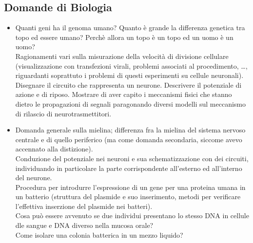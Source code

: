 \documentclass[a4paper,11pt]{article}
\begin{document}
\subsection*{Domande di Biologia}
\begin{itemize}
\item Quanti geni ha il genoma umano? Quanto \`e grande la differenza genetica tra topo ed essere umano? Perch\`e allora un topo \`e un topo ed un uomo \`e un uomo? \\ Ragionamenti vari sulla misurazione della velocit\`a di divisione cellulare (visualizzazione con transfezioni virali, problemi associati al procedimento, \ldots, riguardanti soprattuto i problemi di questi esperimenti su cellule neuronali). \\ Disegnare il circuito che rappresenta un neurone. Descrivere il potenziale di azione e di riposo. Mostrare di aver capito i meccanismi fisici che stanno dietro le propagazioni di segnali paragonando diversi modelli sul meccanismo di rilascio di neurotrasmettitori.
\item Domanda generale sulla mielina; differenza fra la mielina del sistema nervoso centrale e di quello periferico (ma come domanda secondaria, siccome avevo accennato alla distizione). \\ Conduzione del potenziale nei neuroni e sua schematizzazione con dei circuiti, individuando in particolare la parte corrispondente all'esterno ed all'interno del neurone. \\ Procedura per introdurre l'espressione di un gene per una proteina umana in un batterio (struttura del plasmide e suo inserimento, metodi per verificare l'effettiva inserzione del plasmide nei batteri). \\ Cosa pu\`o essere avvenuto se due individui presentano lo stesso DNA in cellule dle sangue e DNA diverso nella mucosa orale? \\ Come isolare una colonia batterica in un mezzo liquido?
\end{itemize}
\end{document}
